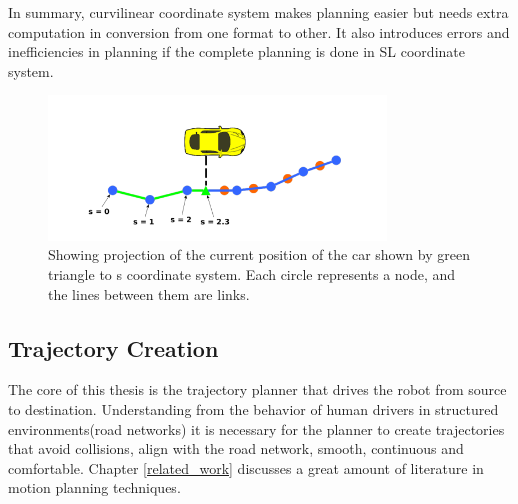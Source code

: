  In summary, curvilinear coordinate system makes planning easier but needs extra computation in conversion from one format to other. It also introduces errors and inefficiencies in planning if the complete planning is done in SL coordinate system.
 
 \begin{figure}[H]
    \centering
    \includegraphics[width=0.8\textwidth]{Images/xy_sl_conversion.png}
    \caption{Showing projection of the current position of the car shown by green triangle to s coordinate system. Each circle represents a node, and the lines between them are links.}
    \label{xy_sl_conversion}
\end{figure}


\subsection{ Trajectory Creation} \label{traj_creation}

The core of this thesis is the trajectory planner that drives the robot from source to destination. Understanding from the behavior of human drivers in structured environments(road networks) it is necessary for the planner to create trajectories that  avoid collisions, align with the road network, smooth, continuous and comfortable. Chapter \ref{related_work} discusses a great amount of literature in motion planning techniques.



